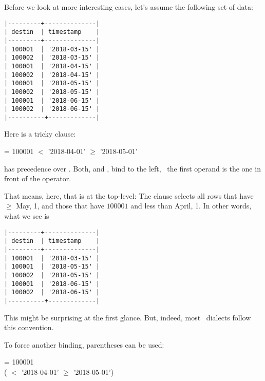 Before we look at more interesting cases,
let's assume the following set of data:

\begin{minipage}{\textwidth}
\begin{verbatim}
|---------+--------------|
| destin  | timestamp    |
|---------+--------------|
| 100001  | '2018-03-15' |
| 100002  | '2018-03-15' |
| 100001  | '2018-04-15' |
| 100002  | '2018-04-15' |
| 100001  | '2018-05-15' |
| 100002  | '2018-05-15' |
| 100001  | '2018-06-15' |
| 100002  | '2018-06-15' |
|----------+-------------|
\end{verbatim}
\end{minipage}

Here is a tricky  clause:

  = 100001
  $<$ '2018-04-01'
  $\ge$ '2018-05-01'

 has precedence over .
Both,  and , bind to the left,
\ie\ the first operand is the one in front of the operator.

That means, here, that  is at the top-level:
The clause selects all rows that have 
$\ge$ May, 1, and those that have  $100001$
and  less than April, 1.
In other words, what we see is

\begin{minipage}{\textwidth}
\begin{verbatim}
|---------+--------------|
| destin  | timestamp    |
|---------+--------------|
| 100001  | '2018-03-15' |
| 100001  | '2018-05-15' |
| 100002  | '2018-05-15' |
| 100001  | '2018-06-15' |
| 100002  | '2018-06-15' |
|----------+-------------|
\end{verbatim}
\end{minipage}

This might be surprising at the first glance.
But, indeed, most \sql\ dialects follow this convention.

To force another binding, parentheses can be used:

\begin{minipage}{\textwidth}
  = 100001 \\
\hspace*{0.45cm} ( $<$ '2018-04-01'
  $\ge$ '2018-05-01')
\end{minipage}

